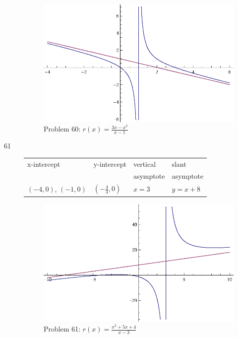\documentclass{exam}
\begin{document}
\begin{description}
      \begin{figure}[H]
        \centering
        \includegraphics[scale = 0.8]{problem60.eps}
        \caption*{ Problem 60: $r(x) = \frac{3x - x^2}{x - 1}$ }
      \end{figure}

    \item[61]
      \begin{tabular}{llll}
        \toprule
        x-intercept          & y-intercept                       & vertical  & slant \\
                             &                                   & asymptote & asymptote \\
        \midrule
        $(-4, 0)$, $(-1, 0)$ & $\left( - \frac{4}{3}, 0 \right)$ & $x = 3$   & $y = x + 8$ \\
        \bottomrule
      \end{tabular}

      \begin{figure}[H]
        \centering
        \includegraphics[scale = 0.8]{problem61.eps}
        \caption*{ Problem 61: $r(x) = \frac{x^2 + 5x + 4}{x - 3}$ }
      \end{figure}


\end{description}
\end{document}
